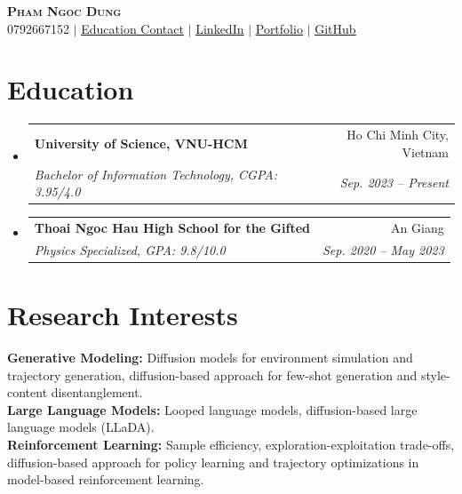 \documentclass[letterpaper,11pt]{article}
\makeatletter
\newcommand{\resumeSubheading}[4]{
  \vspace{-2pt}\item
    \begin{tabular*}{0.97\textwidth}[t]{l@{\extracolsep{\fill}}r}
      \textbf{#1} & #2 \\
      \textit{\small#3} & \textit{\small #4} \\
    \end{tabular*}\vspace{-7pt}
}
\newcommand{\resumeSubHeadingListStart}{\begin{itemize}[leftmargin=0.15in, label={}]}
\newcommand{\resumeSubHeadingListEnd}{\end{itemize}}
\makeatother
\begin{document}

\begin{center}
    \textbf{\Huge \scshape Pham Ngoc Dung} \\ \vspace{1pt}
    \small 0792667152 $|$ \href{mailto:pndung23@clc.fitus.edu.vn}{\underline{Education Contact}} $|$ 
    \href{https://www.linkedin.com/in/dung-pham-99014b29a/}{\underline{LinkedIn}} $|$
    \href{https://dzungphieuluuky.github.io/synaptheos/}{\underline{Portfolio}} $|$
    \href{https://github.com/dzungphieuluuky}{\underline{GitHub}}
\end{center}


\section{Education}
  \resumeSubHeadingListStart
    \resumeSubheading
      {University of Science, VNU-HCM}{Ho Chi Minh City, Vietnam}
      {Bachelor of Information Technology, CGPA: 3.95/4.0}{Sep. 2023 -- Present}
    \resumeSubheading
      {Thoai Ngoc Hau High School for the Gifted}{An Giang}
      {Physics Specialized, GPA: 9.8/10.0}{Sep. 2020 -- May 2023}
  \resumeSubHeadingListEnd

\section{Research Interests}
 \begin{itemize}[leftmargin=0.15in, label={}]
    \small{\item{
     \textbf{Generative Modeling:} Diffusion models for environment simulation and trajectory generation, diffusion-based approach for few-shot generation and style-content disentanglement. \\
     \textbf{Large Language Models:} Looped language models, diffusion-based large language models (LLaDA). \\
     \textbf{Reinforcement Learning:} Sample efficiency, exploration-exploitation trade-offs, diffusion-based approach for policy learning and trajectory optimizations in model-based reinforcement learning.
    }}
 \end{itemize}
 
\end{document}
